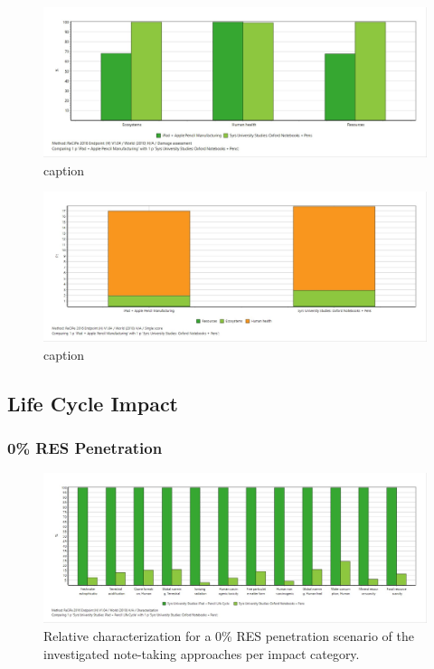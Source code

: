 \begin{figure}[H]
    \centering
    \includegraphics[width=\textwidth]{images/Manufacturing/Damage_Assessment_Manufacturing.JPG}
    \caption{caption}\label{fig:damage_assessment_manufacturing}
\end{figure}

\begin{figure}[H]
    \centering
    \includegraphics[width=\textwidth]{images/Manufacturing/Single_Score_Manufacturing.JPG}
    \caption{caption}\label{fig:single_score_manufacturing}
\end{figure}


\subsection{Life Cycle Impact}\label{subsec:results_life_cycle}

\subsubsection{0\% RES Penetration}

\begin{figure}[H]
    \centering
    \includegraphics[width=\textwidth]{images/RES_0/Characterization_RES_0.JPG}
    \caption{Relative characterization for a 0\% RES penetration scenario of the investigated note-taking approaches per impact category.}\label{fig:characterization_RES_0}
\end{figure}

